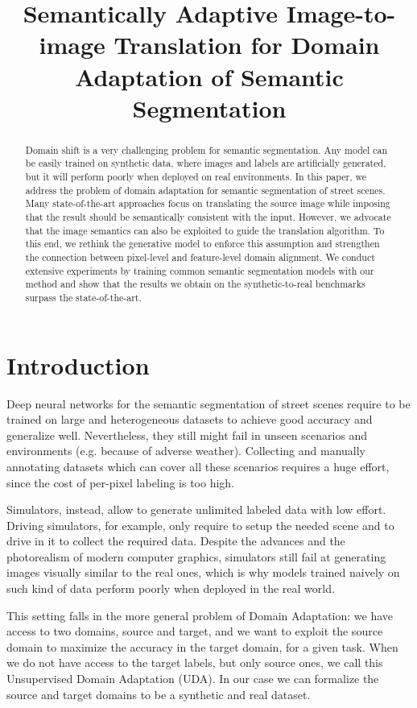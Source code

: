 \documentclass{bmvc2k}
\title{Semantically Adaptive Image-to-image Translation for Domain Adaptation of Semantic Segmentation}
\begin{document}
\maketitle

\begin{abstract}
	Domain shift is a very challenging problem for semantic segmentation. Any model can be easily trained on synthetic data, where images and labels are artificially generated, but it will perform poorly when deployed on real environments. In this paper, we address the problem of domain adaptation for semantic segmentation of street scenes. Many state-of-the-art approaches focus on translating the source image while imposing that the result should be semantically consistent with the input. However, we advocate that the image semantics can also be exploited to guide the translation algorithm. To this end, we rethink the generative model to enforce this assumption and strengthen the connection between pixel-level and feature-level domain alignment. We conduct extensive experiments by training common semantic segmentation models with our method and show that the results we obtain on the synthetic-to-real benchmarks surpass the state-of-the-art.
\end{abstract}


\section{Introduction}
Deep neural networks for the semantic segmentation of street scenes require to be trained on large and heterogeneous datasets to achieve good accuracy and generalize well. Nevertheless, they still might fail in unseen scenarios and environments (e.g. because of adverse weather). Collecting and manually annotating datasets which can cover all these scenarios requires a huge effort, since the cost of per-pixel labeling is too high.

Simulators, instead, allow to generate unlimited labeled data with low effort. Driving simulators, for example, only require to setup the needed scene and to drive in it to collect the required data. Despite the advances and the photorealism of modern computer graphics, simulators still fail at generating images visually similar to the real ones, which is why models trained naively on such kind of data perform poorly when deployed in the real world.

This setting falls in the more general problem of Domain Adaptation: we have access to two domains, source and target, and we want to exploit the source domain to maximize the accuracy in the target domain, for a given task. When we do not have access to the target labels, but only source ones, we call this Unsupervised Domain Adaptation (UDA). In our case we can formalize the source and target domains to be a synthetic and real dataset.
\end{document}
